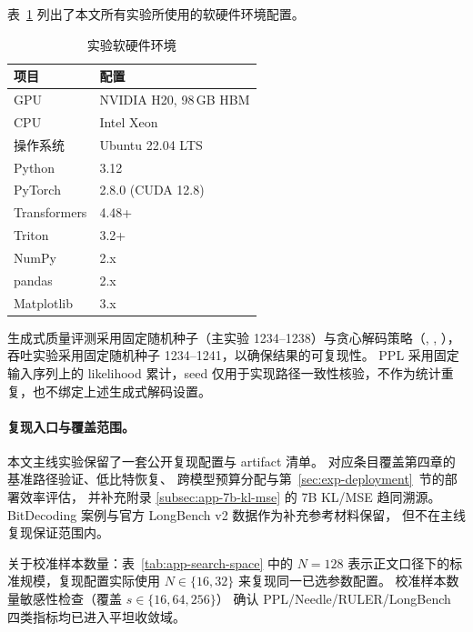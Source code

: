 表~\ref{tab:app-env} 列出了本文所有实验所使用的软硬件环境配置。

\begin{table}[!htbp]
  \centering
  \caption{实验软硬件环境}
  \label{tab:app-env}
  \begin{tabular}{ll}
    \toprule
    \textbf{项目} & \textbf{配置} \\
    \midrule
    GPU             & NVIDIA H20, 98\,GB HBM \\
    CPU             & Intel Xeon \\
    操作系统        & Ubuntu 22.04 LTS \\
    Python          & 3.12 \\
    PyTorch         & 2.8.0 (CUDA 12.8) \\
    Transformers    & 4.48+ \\
    Triton          & 3.2+ \\
    NumPy           & 2.x \\
    pandas          & 2.x \\
    Matplotlib      & 3.x \\
    \bottomrule
  \end{tabular}
\end{table}

生成式质量评测采用固定随机种子（主实验 1234--1238）与贪心解码策略（, , ），吞吐实验采用固定随机种子 1234--1241，以确保结果的可复现性。
PPL 采用固定输入序列上的 likelihood 累计，seed 仅用于实现路径一致性核验，不作为统计重复，也不绑定上述生成式解码设置。

\paragraph{复现入口与覆盖范围。}
\label{sec:app-reproduce}

本文主线实验保留了一套公开复现配置与 artifact 清单。
对应条目覆盖第四章的基准路径验证、低比特恢复、
跨模型预算分配与第~\ref{sec:exp-deployment}~节的部署效率评估，
并补充附录 \ref{subsec:app-7b-kl-mse} 的 7B KL/MSE 趋同溯源。
BitDecoding 案例与官方 LongBench v2 数据作为补充参考材料保留，
但不在主线复现保证范围内。

关于校准样本数量：表~\ref{tab:app-search-space} 中的 $N=128$
表示正文口径下的标准规模，复现配置实际使用
$N\in\{16, 32\}$ 来复现同一已选参数配置。
校准样本数量敏感性检查（覆盖 $s\in\{16, 64, 256\}$）
确认 PPL/Needle/RULER/LongBench 四类指标均已进入平坦收敛域。

